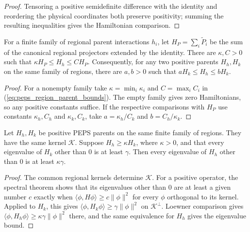 \begin{proof}\leanok
    Tensoring a positive semidefinite difference with the identity
    and reordering the physical coordinates both preserve positivity;
    summing the resulting inequalities gives the Hamiltonian comparison.
\end{proof}

\begin{lemma}%
    \label{thm:peps_finite_parent_comparison}
    \leanok
    For a finite family of regional parent interactions $h_i$, let
    $H_P=\sum_i\widetilde P_i$ be the sum of the canonical regional
    projectors extended by the identity. There are $\kappa,C>0$
    such that $\kappa H_P\le H_h\le CH_P$.
    Consequently, for any two positive parents $H_h,H_k$ on the
    same family of regions, there are $a,b>0$ such that
    $aH_k\le H_h\le bH_k$.
\end{lemma}

\begin{proof}\leanok
    For a nonempty family take $\kappa=\min_i\kappa_i$ and
    $C=\max_i C_i$ in (\ref{eq:peps_region_parent_bounds}).
    The empty family gives zero Hamiltonians, so any positive
    constants suffice. If the respective comparisons with $H_P$
    use constants $\kappa_h,C_h$ and $\kappa_k,C_k$, take
    $a=\kappa_h/C_k$ and $b=C_h/\kappa_k$.
\end{proof}

\begin{lemma}%
    \label{thm:peps_finite_parent_gap_transfer}
    \leanok
    Let $H_h,H_k$ be positive PEPS parents on the same finite family
    of regions. They have the same kernel $\mathcal K$. Suppose
    $H_h\ge\kappa H_k$, where $\kappa>0$, and that every eigenvalue
    of $H_k$ other than $0$ is at least $\gamma$.
    Then every eigenvalue of $H_h$ other than $0$ is at least
    $\kappa\gamma$.
\end{lemma}

\begin{proof}\leanok
    The common regional kernels determine $\mathcal K$.
    For a positive operator, the spectral theorem shows that its
    eigenvalues other than $0$ are at least a given number $c$
    exactly when $\langle\phi,H\phi\rangle\ge c\|\phi\|^2$ for every
    $\phi$ orthogonal to its kernel. Applied to $H_k$, this gives
    $\langle\phi,H_k\phi\rangle\ge\gamma\|\phi\|^2$ on
    $\mathcal K^\perp$. Loewner comparison gives
    $\langle\phi,H_h\phi\rangle\ge\kappa\gamma\|\phi\|^2$ there,
    and the same equivalence for $H_h$ gives the eigenvalue bound.
\end{proof}
